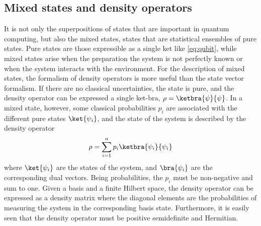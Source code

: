 \subsection{Mixed states and density operators}
It is not only the superpositions of states that are important in quantum computing, but also the mixed states, states that are statistical ensembles of pure states.
Pure states are those expressible as a single ket like \cref{eq:qubit}, while mixed states arise when the preparation the system is not perfectly known or when the system interacts with the environment.
For the description of mixed states, the formalism of density operators is more useful than the state vector formalism.
If there are no classical uncertainties, the state is pure, and the density operator can be expressed a single ket-bra, $\rho = \ketbra{\psi}{\psi}$.
In a mixed state, however, some classical probabilities $p_i$ are associated with the different pure states $\ket{\psi_i}$, and the state of the system is described by the density operator
\begin{equation}
    \rho = \sum_{i=1}^n p_i \ketbra{\psi_i}{\psi_i}
    \label{eq:density}
\end{equation}
where $\ket{\psi_i}$ are the states of the system, and $\bra{\psi_i}$ are the corresponding dual vectors.
Being probabilities, the $p_i$ must be non-negative and sum to one.
Given a basis and a finite Hilbert space, the density operator can be expressed as a density matrix\footnotemark{} where the diagonal elements are the probabilities of measuring the system in the corresponding basis state.
Furthermore, it is easily seen that the density operator must be positive semidefinite and Hermitian.



